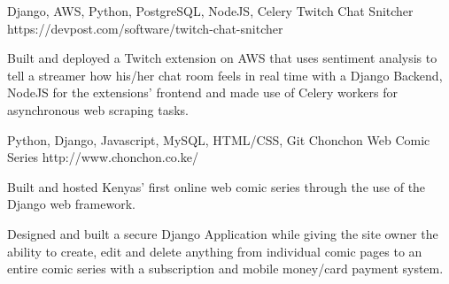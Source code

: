 \begin{cventries}

    \cventry
    {Django, AWS, Python, PostgreSQL, NodeJS, Celery}
    {Twitch Chat Snitcher}
    {https://devpost.com/software/twitch-chat-snitcher}
    {}
    {
      \begin{cvitems}
        \item {Built and deployed a Twitch extension on AWS that uses sentiment analysis to tell a streamer how his/her chat room feels in real time with a Django Backend, NodeJS for the extensions’ frontend and made use of Celery workers for asynchronous web scraping tasks.}
      \end{cvitems}
    }



   \cventry
    {Python, Django, Javascript, MySQL, HTML/CSS, Git}
    {Chonchon Web Comic Series}
    {http://www.chonchon.co.ke/}
    {}
    {
      \begin{cvitems}
        \item {Built and hosted Kenyas' first online web comic series through the use of the Django web framework.}
        \item {Designed and built a secure Django Application while giving the site owner the ability to create, edit and delete anything from individual comic pages to an entire comic series with a subscription and mobile money/card payment system.}
      \end{cvitems}
    }



\end{cventries}


